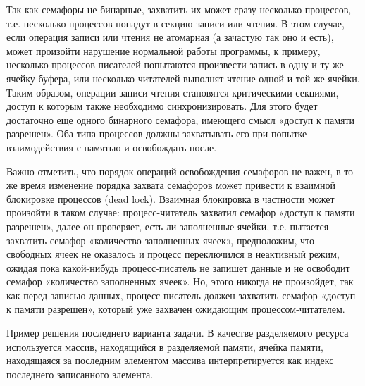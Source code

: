 \documentclass[a4paper]{article}
\begin{document}
	Так как семафоры не бинарные, захватить их может сразу несколько процессов, т.е. несколько процессов попадут в секцию записи или чтения. В этом случае, если операция записи или чтения не атомарная (а зачастую так оно и есть), может произойти нарушение нормальной работы программы, к примеру, несколько процессов-писателей попытаются произвести запись в одну и ту же ячейку буфера, или несколько читателей выполнят чтение одной и той же ячейки. Таким образом, операции записи-чтения становятся критическими секциями, доступ к которым также необходимо синхронизировать. Для этого будет достаточно еще одного бинарного семафора, имеющего смысл «доступ к памяти разрешен». Оба типа процессов должны захватывать его при попытке взаимодействия с памятью и освобождать после.
	
	Важно отметить, что порядок операций освобождения семафоров не важен, в то же время изменение порядка захвата семафоров может привести к взаимной блокировке процессов (dead lock). Взаимная блокировка в частности может произойти в таком случае: процесс-читатель захватил семафор «доступ к памяти разрешен», далее он проверяет, есть ли заполненные ячейки, т.е. пытается захватить семафор «количество заполненных ячеек», предположим, что свободных ячеек не оказалось и процесс переключился в неактивный режим, ожидая пока какой-нибудь процесс-писатель не запишет данные и не освободит семафор «количество заполненных ячеек». Но, этого никогда не произойдет, так как перед записью данных, процесс-писатель должен захватить семафор «доступ к памяти разрешен», который уже захвачен ожидающим процессом-читателем.
	
	Пример решения последнего варианта задачи. В качестве разделяемого ресурса используется массив, находящийся в разделяемой памяти, ячейка памяти, находящаяся за последним элементом массива интерпретируется как индекс последнего записанного элемента.
	
\end{document}
